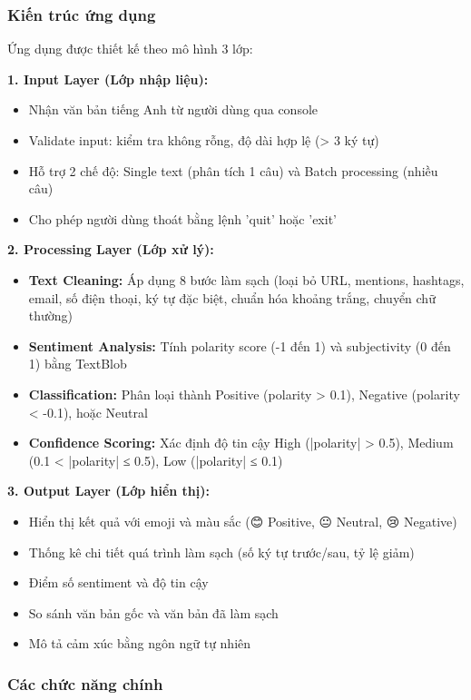 \subsubsection{Kiến trúc ứng dụng}
Ứng dụng được thiết kế theo mô hình 3 lớp:

\textbf{1. Input Layer (Lớp nhập liệu):}
\begin{itemize}
    \item Nhận văn bản tiếng Anh từ người dùng qua console
    \item Validate input: kiểm tra không rỗng, độ dài hợp lệ (> 3 ký tự)
    \item Hỗ trợ 2 chế độ: Single text (phân tích 1 câu) và Batch processing (nhiều câu)
    \item Cho phép người dùng thoát bằng lệnh 'quit' hoặc 'exit'
\end{itemize}

\textbf{2. Processing Layer (Lớp xử lý):}
\begin{itemize}
    \item \textbf{Text Cleaning:} Áp dụng 8 bước làm sạch (loại bỏ URL, mentions, hashtags, email, số điện thoại, ký tự đặc biệt, chuẩn hóa khoảng trắng, chuyển chữ thường)
    \item \textbf{Sentiment Analysis:} Tính polarity score (-1 đến 1) và subjectivity (0 đến 1) bằng TextBlob
    \item \textbf{Classification:} Phân loại thành Positive (polarity > 0.1), Negative (polarity < -0.1), hoặc Neutral
    \item \textbf{Confidence Scoring:} Xác định độ tin cậy High (|polarity| > 0.5), Medium (0.1 < |polarity| ≤ 0.5), Low (|polarity| ≤ 0.1)
\end{itemize}

\textbf{3. Output Layer (Lớp hiển thị):}
\begin{itemize}
    \item Hiển thị kết quả với emoji và màu sắc (😊 Positive, 😐 Neutral, 😢 Negative)
    \item Thống kê chi tiết quá trình làm sạch (số ký tự trước/sau, tỷ lệ giảm)
    \item Điểm số sentiment và độ tin cậy
    \item So sánh văn bản gốc và văn bản đã làm sạch
    \item Mô tả cảm xúc bằng ngôn ngữ tự nhiên
\end{itemize}

\subsubsection{Các chức năng chính}

